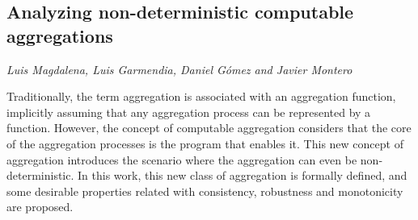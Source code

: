 \documentclass[../booklet.tex]{subfiles}
\begin{document}
\subsection[Analyzing non-deterministic computable aggregations. {\it Luis Magdalena, Luis Garmendia, Daniel Gómez and Javier Montero}]{Analyzing non-deterministic computable aggregations}
   

\begin{center}
  {\it Luis Magdalena, Luis Garmendia, Daniel Gómez and Javier Montero}
\end{center}

\vskip 0.8cm



Traditionally, the term aggregation is associated with an aggregation function, implicitly assuming that any aggregation process can be represented by a function. However, the concept of computable aggregation considers that the core of the aggregation processes is the program that enables it. This new concept of aggregation introduces the scenario where the aggregation can even be non-deterministic. In this work, this new class of aggregation is formally defined, and some desirable properties related with consistency, robustness and monotonicity are proposed.  

\end{document}
